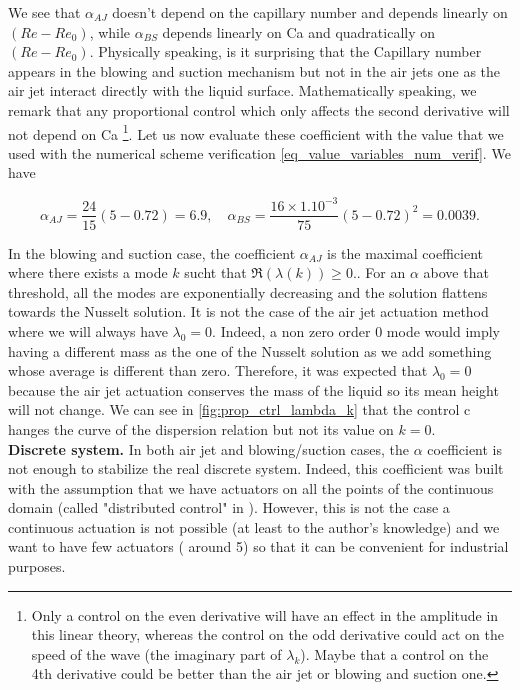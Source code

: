 \documentclass[12pt]{article}
\begin{document}
We see that $\alpha_{AJ}$ doesn't depend on the capillary number and depends linearly on $(Re-Re_0)$, while $\alpha_{BS}$
 depends linearly on Ca and quadratically on $(Re-Re_0)$. Physically speaking, is it surprising that the Capillary number 
 appears in the blowing and suction mechanism but not in the air jets one as the air jet interact directly with the liquid 
 surface. Mathematically speaking, we remark that any proportional control which only affects the second derivative will not 
 depend on Ca \footnote{Only a control on the even derivative will have an effect in the amplitude in this linear theory, whereas 
 the control on the odd derivative could act on the speed of the wave (the imaginary part of $\lambda_k$). Maybe that a control on 
 the 4th derivative could be better than the air jet or blowing and suction one.}. Let us now evaluate these coefficient with the 
 value that we used with the numerical scheme verification \eqref{eq_value_variables_num_verif}. We have 

$$\alpha_{AJ} = \frac{24}{15}(5-0.72) = 6.9, \quad \alpha_{BS} = \frac{16\times 1.10^{-3}}{75}(5-0.72)^2= 0.0039.$$






In the blowing and suction case,  the coefficient $\alpha_{AJ}$ is the maximal coefficient where there exists a mode $k$ sucht 
that $\mathfrak{R}(\lambda(k)) \geq 0.$. For an $\alpha$ above that threshold, all the modes are exponentially decreasing and the 
solution flattens towards the Nusselt solution. It is not the case of the air jet actuation method where we will always have 
$\lambda_0=0.$ Indeed, a non zero order 0 mode would imply having a different mass as the one of the Nusselt solution as we add 
something whose average is different than zero. Therefore, it was expected that $\lambda_0 = 0$ because the air jet actuation 
conserves the mass of the liquid so its mean height will not change. We can see in \eqref{fig:prop_ctrl_lambda_k} that the control c
hanges the curve of the dispersion relation but not its value on $k=0$.
\\

\textbf{Discrete system.} In both air jet and blowing/suction cases, the $\alpha$ coefficient is not enough to stabilize the real 
discrete system. Indeed, this coefficient was built with the assumption that we have actuators on all the points of the continuous 
domain (called "distributed control" in \cite{Thompson_2016_prop_ctrl}). However, this is not the case a continuous actuation is not
 possible (at least to the author's knowledge) and we want to have few actuators ( around 5) so that it can be convenient for industrial
 purposes. 
\end{document}
